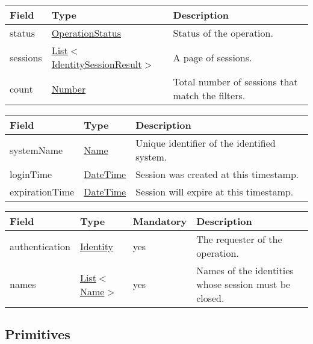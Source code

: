 \documentclass[a4paper]{arrowhead}
\newcommand{\pref}[1]{{\textcolor{ArrowheadGrey}{\hyperref[sec:model:primitives:#1]{#1}}}}
\begin{document}

\begin{table}[ht!]
\begin{tabularx}{\textwidth}{| p{2.5cm} | p{3.2cm} | X |} \hline
\rowcolor{gray!33} Field & Type      & Description \\ \hline
status & \pref{OperationStatus} & Status of the operation. \\ \hline
sessions & \pref{List}$<$\hyperref[sec:model:IdentitySessionResult]{IdentitySessionResult}$>$ & A page of sessions. \\ \hline
count & \pref{Number} & Total number of sessions that match the filters. \\ \hline
\end{tabularx}
\end{table}

 
\begin{table}[ht!]
\begin{tabularx}{\textwidth}{| p{3.3cm} | p{4cm} | X |} \hline
\rowcolor{gray!33} Field & Type      & Description \\ \hline
systemName & \pref{Name} & Unique identifier of the identified system. \\ \hline
loginTime & \pref{DateTime} & Session was created at this timestamp. \\ \hline
expirationTime & \pref{DateTime} & Session will expire at this timestamp. \\ \hline
\end{tabularx}
\end{table}


\begin{table}[ht!]
\begin{tabularx}{\textwidth}{| p{2.5cm} | p{2.5cm} | p{2cm} | X |} \hline
\rowcolor{gray!33} Field & Type & Mandatory & Description \\ \hline
authentication & \hyperref[sec:model:Identity]{Identity} & yes & The requester of the operation. \\ \hline
names &  \pref{List}$<$\pref{Name}$>$ & yes & Names of the identities whose session must be closed. \\ \hline
\end{tabularx}
\end{table}

\subsection{Primitives}
\label{sec:model:primitives}
\end{document}

